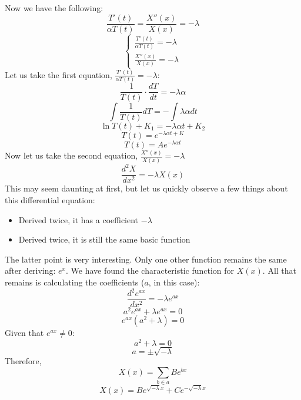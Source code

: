 \documentclass[a4paper]{article}
\begin{document}
            Now we have the following:
            \[
                \frac{T'\left(t\right)}{\alpha T\left(t\right)} = \frac{X''\left(x\right)}{X\left(x\right)} = -\lambda
            \]
            \[
                \begin{cases}
                    \frac{T'\left(t\right)}{\alpha T\left(t\right)} = -\lambda \\
                    \frac{X''\left(x\right)}{X\left(x\right)} = -\lambda
                \end{cases}
            \]
            Let us take the first equation, $\frac{T'\left(t\right)}{\alpha T\left(t\right)} = -\lambda$:
            \[
                \frac{1}{T\left(t\right)}\cdot\frac{dT}{dt} = -\lambda \alpha
            \]
            \[
                \int{\frac{1}{T\left(t\right)}}dT = -\int{\lambda \alpha}dt
            \]
            \[
                \ln{T\left(t\right)} + K_1= -\lambda \alpha t + K_2
            \]
            \[
                T\left(t\right) = e^{-\lambda \alpha t + K}
            \]
            \begin{equation}
                T\left(t\right) = A e^{-\lambda \alpha t}
            \end{equation}
            Now let us take the second equation, $\frac{X''\left(x\right)}{X\left(x\right)} = -\lambda$
            \[
                \frac{d^{2}X}{dx^{2}} = -\lambda X\left(x\right)
            \]
            This may seem daunting at first, but let us quickly observe a few things about this
            differential equation:
            \begin{itemize}
                \item Derived twice, it has a coefficient $-\lambda$
                \item Derived twice, it is still the same basic function
            \end{itemize}
            The latter point is very interesting. Only one other function remains the same after
            deriving: $e^{x}$. We have found the characteristic function for $X\left(x\right)$. All that remains
            is calculating the coefficients ($a$, in this case):
            \[
                \frac{d^{2} e^{ax}}{dx^{2}} = -\lambda e^{ax}
            \]
            \[
                a^{2} e^{ax} + \lambda e^{ax} = 0
            \]
            \[
                e^{ax}\left(a^{2} + \lambda\right) = 0
            \]
            Given that $e^{ax} \neq 0$:
            \[
                a^{2} + \lambda = 0
            \]
            \[
                a = \pm\sqrt{-\lambda}
            \]
            Therefore,
            \[
                X\left(x\right) = \sum_{b \in a}{B e^{bx}}
            \]
            \begin{equation}
                X\left(x\right) = B e^{\sqrt{-\lambda}x} + C e^{-\sqrt{-\lambda}x}
            \end{equation}
\end{document}
